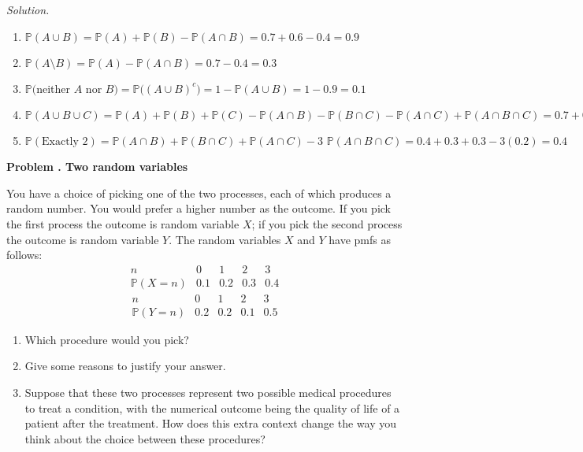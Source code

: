 \documentclass[11pt]{article}
\newcounter{problem}
\newenvironment{problem}[1][]{%
  \refstepcounter{problem}%
  \bigskip\noindent\textbf{Problem \theproblem. #1}\par\smallskip
}{\bigskip}
\newenvironment{solution}{%
  \noindent\textit{Solution.}\quad
}{\par\bigskip}
\begin{document}
\begin{solution}
\begin{enumerate}
      \item $\mathbb{P}(A\cup B) = \mathbb{P}(A) + \mathbb{P}(B) - \mathbb{P}(A\cap B)
            = 0.7 + 0.6 - 0.4 = 0.9$
      \item $\mathbb{P}(A\setminus B) = \mathbb{P}(A) - \mathbb{P}(A\cap B) 
            = 0.7 - 0.4 = 0.3$
      \item $\mathbb{P}($neither $A$ nor $B$$) = \mathbb{P}\bigl((A\cup B)^{c}\bigr)
            = 1 - \mathbb{P}(A\cup B) = 1 - 0.9 = 0.1$
      \item $\mathbb{P}(A\cup B\cup C) = \mathbb{P}(A) + \mathbb{P}(B) + \mathbb{P}(C)
            - \mathbb{P}(A\cap B) - \mathbb{P}(B\cap C) - \mathbb{P}(A\cap C) + 
            \mathbb{P}(A\cap B\cap C) = 0.7 + 0.6 + 0.5 - 0.4 - 0.3 - 0.3 + 0.2 = 1$
      \item $\mathbb{P}(\text{Exactly } 2) = \mathbb{P}(A\cap B) + \mathbb{P}(B\cap C) + 
            \mathbb{P}(A\cap C) - \text{3 }\mathbb{P}(A\cap B\cap C) = 
            0.4 + 0.3 + 0.3 - 3(0.2) = 0.4$
\end{enumerate}
\end{solution}

\begin{problem}[Two random variables]
You have a choice of picking one of the two processes, each of which produces a random 
number. You would prefer a higher number as the outcome. If you pick the first process 
the outcome is random variable $X$; if you pick the second process the outcome is random 
variable $Y$. The random variables $X$ and $Y$ have pmfs as follows:
\[
\begin{array}{c|cccc}
n      & 0   & 1   & 2   & 3 \\ \hline
\mathbb{P}(X=n) & 0.1 & 0.2 & 0.3 & 0.4
\end{array}
\]
\[
\begin{array}{c|cccc}
n      & 0   & 1   & 2   & 3 \\ \hline
\mathbb{P}(Y=n) & 0.2 & 0.2 & 0.1 & 0.5
\end{array}
\]
\begin{enumerate}
      \item Which procedure would you pick?
      \item Give some reasons to justify your answer.
      \item Suppose that these two processes represent two possible medical procedures 
            to treat a condition, with the numerical outcome being the quality of life 
            of a patient after the treatment. How does this extra context change the 
            way you think about the choice between these procedures?
\end{enumerate}
\end{problem}
\end{document}
